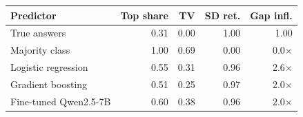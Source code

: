 \setlength{\tabcolsep}{2.6pt}
\begin{tabular}{@{}lrrrr@{}}
\toprule
\textbf{Predictor} & \textbf{Top share} & \textbf{TV} & \textbf{SD ret.} & \textbf{Gap infl.} \\
\midrule
True answers & 0.31 & 0.00 & 1.00 & 1.00 \\
Majority class & 1.00 & 0.69 & 0.00 & 0.0$\times$ \\
Logistic regression & 0.55 & 0.31 & 0.96 & 2.6$\times$ \\
Gradient boosting & 0.51 & 0.25 & 0.97 & 2.0$\times$ \\
Fine-tuned Qwen2.5-7B & 0.60 & 0.38 & 0.96 & 2.0$\times$ \\
\bottomrule
\end{tabular}